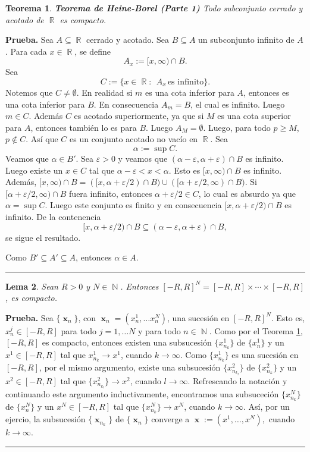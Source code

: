 \documentclass[x11names, 12pt]{book}
\newtheorem{teorema}{Teorema}
\newtheorem{lema}[teorema]{Lema}
\newenvironment{prueba}[1][Prueba]{\noindent\textbf{#1.} }{\ \rule{0.5em}{0.5em}}
\DeclareMathOperator{\x}{\textbf{x}}
\DeclareMathOperator{\ene}{\mathbb{N}}
\DeclareMathOperator{\R}{\mathbb{R}}
\begin{document}
\begin{teorema}\label{weierstrass1}{\textbf{Teorema de Heine-Borel (Parte 1)}}
Todo subconjunto cerrado y acotado de $\R$ es compacto.
\end{teorema}
\begin{prueba}
Sea $A\subseteq \R$ cerrado y acotado. Sea $B\subseteq A$ un subconjunto infinito de $A$. Para cada $x\in \R$, se define \[A_x:=[x, \infty )\cap B.\]
Sea
\[C:=\{x \in \R: \ \  A_x \, \text{es infinito}\}.\]
Notemos que $C\neq \emptyset$. En realidad si $m$ es una cota inferior para $A$, entonces es una cota inferior para $B$. En consecuencia $A_m=B$, el cual es infinito. Luego $m \in C$. Además $C$ es acotado superiormente, ya que si $M$ es una cota superior para $A$, entonces también lo es para $B$. Luego $A_M=\emptyset$. Luego, para todo $p\geq M$, $p\notin C$. Así que $C$ es un conjunto acotado no vacío en $\R$.
Sea \[\alpha := \sup C.\]
Veamos que $\alpha \in B'.$ Sea $\varepsilon>0$ y veamos que $(\alpha-\varepsilon , \alpha+\varepsilon)\cap B$ es infinito. Luego existe un $x\in C$ tal que $\alpha-\varepsilon < x < \alpha $. Esto es $[x, \infty) \cap B$ es infinito. Además, $[x, \infty) \cap B=([x, \alpha +\varepsilon /2) \cap B) \cup ([\alpha +\varepsilon /2, \infty) \cap B)$. Si $[\alpha +\varepsilon /2, \infty) \cap B$ fuera infinito, entonces  $\alpha +\varepsilon /2 \in C$, lo cual es absurdo ya que $\alpha =\sup C$. Luego este conjunto es finito y en consecuencia $[x, \alpha +\varepsilon /2) \cap B$ es infinito. De la contenencia
\[ [x, \alpha +\varepsilon /2) \cap B \subseteq  (\alpha-\varepsilon , \alpha+\varepsilon)\cap B,\]
se sigue el resultado.

Como $B'\subseteq A' \subseteq A$, entonces $\alpha \in A.$
\end{prueba}

\begin{lema}\label{prod-comp}
Sean $R>0$ y $N\in \ene$. Entonces $[-R,R]^N=[-R,R] \times \cdots \times [-R,R]$, es compacto.
\end{lema}
\begin{prueba}
Sea $\{\x_n\}$, con $\x_n=(x_n^1,\dots x_n^N)$, una sucesión en $[-R,R]^N$. Esto es,  $x_n^j\in [-R, R]$ para todo $j=1, \dots N$ y para todo $n\in \ene$. Como por el Teorema \ref{weierstrass1}, $[-R, R]$ es compacto, entonces existen una subsucesión $\{x_{n_k}^1\}$ de $\{x_{n}^1\}$ y un  $x^1\in [-R, R]$ tal que $x_{n_k}^1 \to x^1$, cuando $k\to \infty$. Como $\{x_{n_k}^1\}$ es una sucesión en $[-R, R]$, por el mismo argumento, existe una  subsucesión $\{x_{n_{k_l}}^2\}$ de $\{x_{n_k}^2\}$ y un $x^2\in [-R, R]$ tal que $\{x_{n_{k_l}}^2\}\to x^2$, cuando
$l\to \infty$. Refrescando la notación y continuando este argumento inductivamente, encontramos una subsuceción $\{x_{n_{k}}^N\}$ de $\{x_{n}^N\}$ y un $x^N\in [-R, R]$ tal que $\{x_{n_{k}}^N\}\to x^N$, cuando
$k\to \infty$. Así, por un ejercio, la subsucesión $\{\x_{n_k}\}$ de $\{\x_n\}$ converge a $\x:=(x^1, \dots , x^N), $ cuando $k\to \infty .$
\end{prueba}
\end{document}
